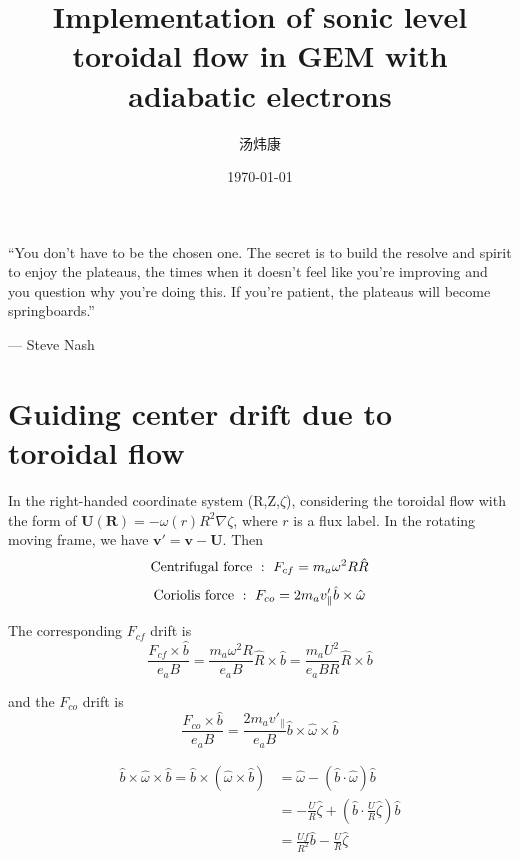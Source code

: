 \documentclass[12pt]{article}
\begin{document}
\begin{CJK*}{UTF8}{gbsn}
\title{\textbf{Implementation of sonic level toroidal flow in GEM with adiabatic electrons}}
\author{汤炜康}
\date{\today}
\maketitle
\tableofcontents
\newpage

``You don't have to be the chosen one. The secret is to build the resolve and spirit 
to enjoy the plateaus, the times when it doesn't feel like you're improving and you 
question why you're doing this. If you're patient, the plateaus will become springboards.''

{\hfill --- Steve Nash}

\newpage
\section{Guiding center drift due to toroidal flow}
In the right-handed coordinate system (R,Z,$\zeta$), considering the toroidal flow with the form of $\mathbf{U}(\mathbf{R}) = -\omega(r)R^2 \nabla \zeta$, where $r$ is a flux label.
In the rotating moving frame\cite{artun1994}, we have ${\mathbf v'=\mathbf v-\mathbf U}$. Then 
\begin{equation}
    {\rm Centrifugal\ force}\ :\ F_{cf} = m_a\omega^2R\hat{R}
\end{equation}
\begin{equation}
    {\rm Coriolis\ force}\ :\ F_{co} = 2m_av'_\parallel\hat{b}\times\hat{\omega}
\end{equation}

The corresponding $F_{cf}$ drift is
\begin{equation}
    \frac{F_{cf}\times\hat{b}}{e_aB} = \frac{m_a\omega^2R}{e_aB}\hat{R}\times\hat{b} = \frac{m_aU^2}{e_aBR}\hat{R}\times\hat{b}
\end{equation} 

and the $F_{co}$ drift is
\begin{equation}
    \frac{F_{co}\times\hat{b}}{e_aB} = \frac{2m_av'_\parallel}{e_aB} \hat{b}\times\hat{\omega}\times\hat{b}
\end{equation}

{\color{cyan}
\begin{equation*}
    \begin{split}
        \hat{b}\times\hat{\omega}\times\hat{b} = \hat{b}\times(\hat{\omega}\times\hat{b}) &= \hat{\omega} - (\hat{b}\cdot\hat{\omega})\hat{b}\\
        &= -\frac{U}{R}\hat{\zeta} + (\hat{b}\cdot\frac{U}{R}\hat{\zeta})\hat{b}\\
        &= \frac{Uf}{R^2}\hat{b} -\frac{U}{R}\hat{\zeta}
    \end{split}
\end{equation*}
}


\end{CJK*}
\end{document}

